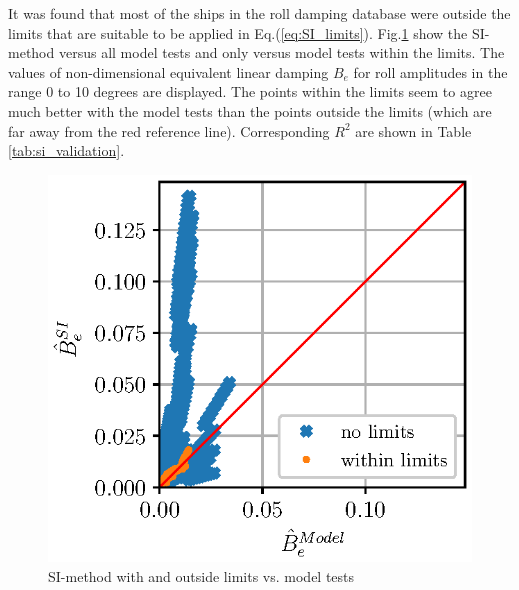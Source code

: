 It was found that most of the ships in the roll damping database were outside the limits that are suitable to be applied in Eq.(\ref{eq:SI_limits}). Fig.\ref{fig:si_model_within} show the SI-method versus all model tests and only versus model tests within the limits. The values of non-dimensional equivalent linear damping $B_e$ for roll amplitudes in the range 0 to 10 degrees are displayed. The points within the limits seem to agree much better with the model tests than the points outside the limits (which are far away from the red reference line). Corresponding $R^2$ are shown in Table \ref{tab:si_validation}.



\begin{figure}[H]
\centering
  \centering
  \includegraphics[]{figures/si_model_within.eps}
  \vspace{-0.5cm}
  \caption{SI-method with and outside limits vs. model tests}
  \label{fig:si_model_within}
\end{figure}



